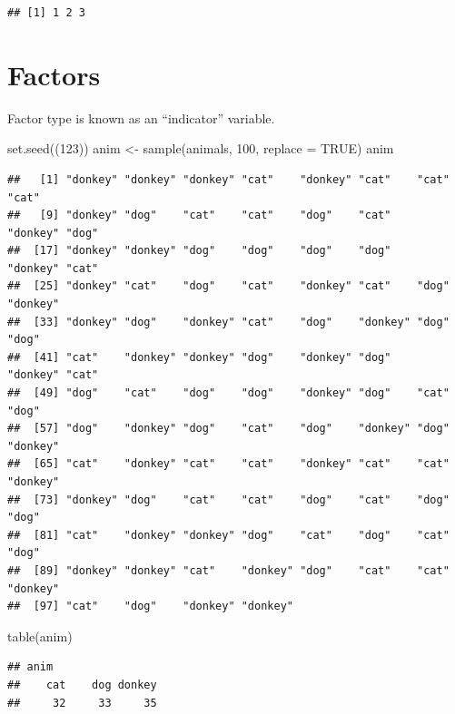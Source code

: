 \documentclass[
]{book}
\newenvironment{Shaded}{\begin{snugshade}}{\end{snugshade}}
\newcommand{\AttributeTok}[1]{\textcolor[rgb]{0.77,0.63,0.00}{#1}}
\newcommand{\ConstantTok}[1]{\textcolor[rgb]{0.00,0.00,0.00}{#1}}
\newcommand{\DecValTok}[1]{\textcolor[rgb]{0.00,0.00,0.81}{#1}}
\newcommand{\FunctionTok}[1]{\textcolor[rgb]{0.00,0.00,0.00}{#1}}
\newcommand{\NormalTok}[1]{#1}
\newcommand{\OtherTok}[1]{\textcolor[rgb]{0.56,0.35,0.01}{#1}}
\theoremstyle{definition}
\theoremstyle{definition}
\theoremstyle{definition}
\theoremstyle{definition}
\theoremstyle{remark}
\begin{document}
\begin{verbatim}
## [1] 1 2 3
\end{verbatim}

\hypertarget{factors}{%
\section{Factors}\label{factors}}

Factor type is known as an ``indicator'' variable.

\begin{Shaded}
\begin{Highlighting}[]
\FunctionTok{set.seed}\NormalTok{((}\DecValTok{123}\NormalTok{))}
\NormalTok{anim }\OtherTok{\textless{}{-}} \FunctionTok{sample}\NormalTok{(animals, }\DecValTok{100}\NormalTok{, }\AttributeTok{replace =} \ConstantTok{TRUE}\NormalTok{)}
\NormalTok{anim}
\end{Highlighting}
\end{Shaded}

\begin{verbatim}
##   [1] "donkey" "donkey" "donkey" "cat"    "donkey" "cat"    "cat"    "cat"   
##   [9] "donkey" "dog"    "cat"    "cat"    "dog"    "cat"    "donkey" "dog"   
##  [17] "donkey" "donkey" "dog"    "dog"    "dog"    "dog"    "donkey" "cat"   
##  [25] "donkey" "cat"    "dog"    "cat"    "donkey" "cat"    "dog"    "donkey"
##  [33] "donkey" "dog"    "donkey" "cat"    "dog"    "donkey" "dog"    "dog"   
##  [41] "cat"    "donkey" "donkey" "dog"    "donkey" "dog"    "donkey" "cat"   
##  [49] "dog"    "cat"    "dog"    "dog"    "donkey" "dog"    "cat"    "dog"   
##  [57] "dog"    "donkey" "dog"    "cat"    "dog"    "donkey" "dog"    "donkey"
##  [65] "cat"    "donkey" "cat"    "cat"    "donkey" "cat"    "cat"    "donkey"
##  [73] "donkey" "dog"    "cat"    "cat"    "dog"    "cat"    "dog"    "dog"   
##  [81] "cat"    "donkey" "donkey" "dog"    "cat"    "dog"    "cat"    "dog"   
##  [89] "donkey" "donkey" "cat"    "donkey" "dog"    "cat"    "cat"    "donkey"
##  [97] "cat"    "dog"    "donkey" "donkey"
\end{verbatim}

\begin{Shaded}
\begin{Highlighting}[]
\FunctionTok{table}\NormalTok{(anim)}
\end{Highlighting}
\end{Shaded}

\begin{verbatim}
## anim
##    cat    dog donkey 
##     32     33     35
\end{verbatim}
\end{document}
